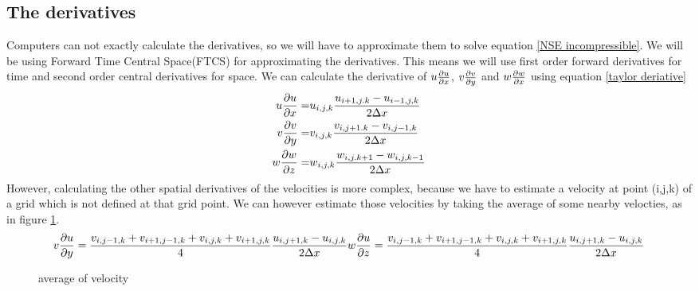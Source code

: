 \documentclass{article}
\begin{document}
\subsection{The derivatives}
Computers can not exactly calculate the derivatives, so we will have to approximate them to solve equation \ref{NSE incompressible}. We will be using Forward Time Central Space(FTCS) for approximating the derivatives\cite{MAC}. This means we will use first order forward derivatives for time and second order central derivatives for space. We can calculate the derivative of \(u\pdv{u}{x}\), \(v\pdv{v}{y}\) and \(w\pdv{w}{x}\)  using equation \ref{taylor deriative}
\[\begin{split}
  u\pdv{u}{x}=& u_{i,j,k}\frac{u_{i+1,j.k}-u_{i-1,j,k}}{2\Delta x}\\
  v\pdv{v}{y}=& v_{i,j,k}\frac{v_{i,j+1.k}-v_{i,j-1,k}}{2\Delta x}\\
  w\pdv{w}{z}=& w_{i,j,k}\frac{w_{i,j.k+1}-w_{i,j,k-1}}{2\Delta x}
\end{split}\]
However, calculating the other spatial derivatives of the velocities is more complex, because we have to estimate a velocity at point (i,j,k) of a grid which is not defined at that grid point. We can however estimate those velocities by taking the average of some nearby velocties, as in figure \ref{velocity to other grid}\cite{MAC}.
\[\begin{split}
  v\pdv{u}{y}=\frac{v_{i,j-1,k}+v_{i+1,j-1,k}+v_{i,j,k}+v_{i+1,j,k}}{4}\frac{u_{i,j+1,k}-u_{i,j,k}}{2\Delta x}
  w\pdv{u}{z}=\frac{v_{i,j-1,k}+v_{i+1,j-1,k}+v_{i,j,k}+v_{i+1,j,k}}{4}\frac{u_{i,j+1,k}-u_{i,j,k}}{2\Delta x}
\end{split}
\]

\begin{figure}
\centering

\caption{average of velocity} \label{velocity to other grid}
\end{figure}
\end{document}
